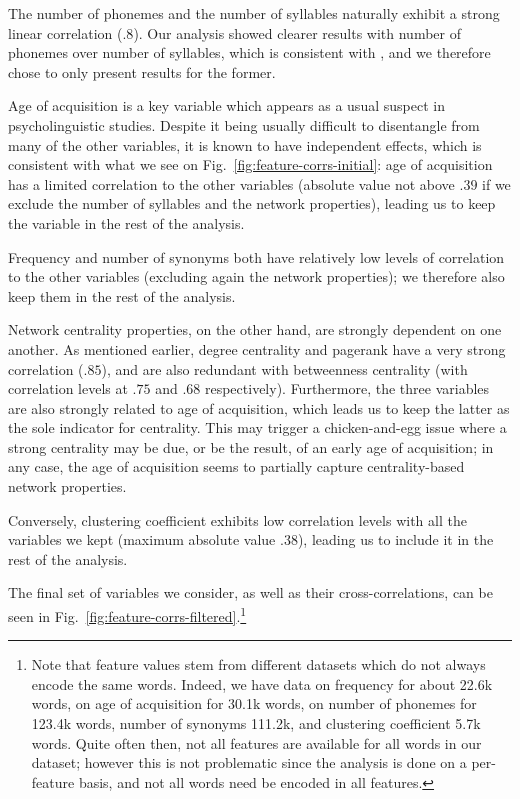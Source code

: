 The number of phonemes and the number of syllables naturally exhibit a strong linear correlation ($.8$).
Our analysis showed clearer results with number of phonemes over number of syllables, which is consistent with \citet{nick-diss}, and we therefore chose to only present results for the former.

Age of acquisition is a key variable which appears as a usual suspect in psycholinguistic studies.
Despite it being usually difficult to disentangle from many of the other variables, it is known to have independent effects, which is consistent with what we see on Fig.~\ref{fig:feature-corrs-initial}: age of acquisition has a limited correlation to the other variables (absolute value not above $.39$ if we exclude the number of syllables and the network properties), leading us to keep the variable in the rest of the analysis.

Frequency and number of synonyms both have relatively low levels of correlation to the other variables (excluding again the network properties); we therefore also keep them in the rest of the analysis.

\bigskip
Network centrality properties, on the other hand, are strongly dependent on one another.
As mentioned earlier, degree centrality and pagerank have a very strong correlation ($.85$), and are also redundant with betweenness centrality (with correlation levels at $.75$ and $.68$ respectively).
Furthermore, the three variables are also strongly related to age of acquisition, which leads us to keep the latter as the sole indicator for centrality. This may trigger a chicken-and-egg issue where a strong centrality may be due, or be the result, of an early age of acquisition; in any case, the age of acquisition seems to partially capture centrality-based network properties.

Conversely, clustering coefficient exhibits low correlation levels with all the variables we kept (maximum absolute value $.38$), leading us to include it in the rest of the analysis.

The final set of variables we consider, as well as their cross-correlations, can be seen in Fig.~\ref{fig:feature-corrs-filtered}.\footnote{Note that feature values stem from different datasets which do not always encode the same words.
Indeed, we have data on frequency for about 22.6k words, on age of acquisition for 30.1k words, on number of phonemes for 123.4k words, number of synonyms 111.2k, and clustering coefficient 5.7k words.
Quite often then, not all features are available for all words in our dataset; %
however this is not problematic since the analysis is done on a per-feature basis, and not all words need be encoded in all features.}

